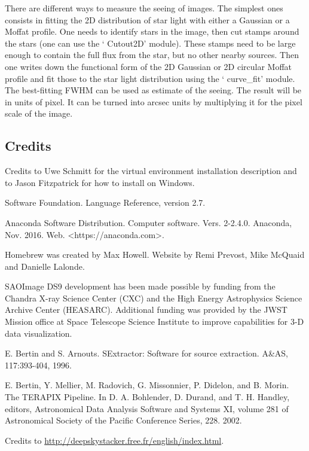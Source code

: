 \documentclass[a4paper, 11pt, fleqn]{memoir}
\begin{document}
There are different ways to measure the seeing of images.
The simplest ones consists in fitting the 2D distribution of star light with either a Gaussian or a Moffat profile.
One needs to identify stars in the image, then cut stamps around the stars (one can use the ` Cutout2D'  module).
These stamps need to be large enough to contain the full flux from the star, but no other nearby sources.
Then one writes down the functional form of the 2D Gaussian or 2D circular Moffat profile and fit those to the star light distribution using the ` curve\_fit'  module.
The best-fitting FWHM can be used as estimate of the seeing.
The result will be in units of pixel.
It can be turned into arcsec units by multiplying it for the pixel scale of the image.

\subsection{Credits}

Credits to Uwe Schmitt for the virtual environment installation description and to Jason Fitzpatrick for how to install  on Windows.

Software Foundation.
Language Reference, version 2.7.

Anaconda Software Distribution.
Computer software.
Vers.
2-2.4.0.
Anaconda, Nov.
2016.
Web.
<https://anaconda.com>.

Homebrew was created by Max Howell.
Website by Remi Prevost, Mike McQuaid and Danielle Lalonde.

SAOImage DS9 development has been made possible by funding from the Chandra X-ray Science Center (CXC) and the High Energy Astrophysics Science Archive Center (HEASARC).
Additional funding was provided by the JWST Mission office at Space Telescope Science Institute to improve capabilities for 3-D data visualization.

E.
Bertin and S.
Arnouts.
SExtractor: Software for source extraction.
A\&AS, 117:393-404, 1996.

E.
Bertin, Y.
Mellier, M.
Radovich, G.
Missonnier, P.
Didelon, and B.
Morin.
The TERAPIX Pipeline.
In D.
A.
Bohlender, D.
Durand, and T.
H.
Handley, editors, Astronomical Data Analysis Software and Systems XI, volume 281 of Astronomical Society of the Pacific Conference Series, 228.
2002.

Credits to \url{http://deepskystacker.free.fr/english/index.html}.
\end{document}
